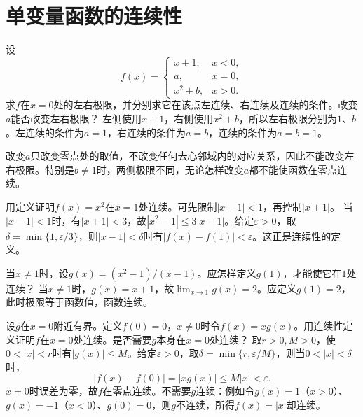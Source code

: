 \par\addvspace{12pt}

\section{单变量函数的连续性}

\label{sol:sec:functions:2}

设
\begin{equation*}
 f(x)=\begin{cases}
 x+1,&x<0,\\
 a,&x=0,\\
 x^2+b,&x>0.
 \end{cases}
\end{equation*}
求\(f\)在\(x=0\)处的左右极限，并分别求它在该点左连续、右连续及连续的条件。改变\(a\)能否改变左右极限？
\solutionanswer
左侧使用\(x+1\)，右侧使用\(x^2+b\)，所以左右极限分别为\(1\)、\(b\)。左连续的条件为\(a=1\)，右连续的条件为\(a=b\)，连续的条件为\(a=b=1\)。

改变\(a\)只改变零点处的取值，不改变任何去心邻域内的对应关系，因此不能改变左右极限。特别是\(b\ne1\)时，两侧极限不同，无论怎样改变\(a\)都不能使函数在零点连续。


用定义证明\(f(x)=x^2\)在\(x=1\)处连续。可先限制\(|x-1|<1\)，再控制\(|x+1|\)。
\solutionanswer
当\(|x-1|<1\)时，有\(|x+1|<3\)，故\(|x^2-1|\le3|x-1|\)。给定\(\varepsilon>0\)，取\(\delta=\min\{1,\varepsilon/3\}\)，则\(|x-1|<\delta\)时有\(|f(x)-f(1)|<\varepsilon\)。这正是连续性的定义。


当\(x\ne1\)时，设\(g(x)=(x^2-1)/(x-1)\)。应怎样定义\(g(1)\)，才能使它在\(1\)处连续？
\solutionanswer
当\(x\ne1\)时，\(g(x)=x+1\)，故\(\lim_{x\to1}g(x)=2\)。应定义\(g(1)=2\)，此时极限等于函数值，函数连续。


设\(g\)在\(x=0\)附近有界。定义\(f(0)=0\)，\(x\ne0\)时令\(f(x)=xg(x)\)。用连续性定义证明\(f\)在\(x=0\)处连续。是否需要\(g\)本身在\(x=0\)处连续？
\solutionanswer
取\(r>0,M>0\)，使\(0<|x|<r\)时有\(|g(x)|\le M\)。给定\(\varepsilon>0\)，取\(\delta=\min\{r,\varepsilon/M\}\)，则当\(0<|x|<\delta\)时，
\[
|f(x)-f(0)|=|xg(x)|\le M|x|<\varepsilon.
\]
\(x=0\)时误差为零，故\(f\)在零点连续。不需要\(g\)连续：例如令\(g(x)=1\)（\(x>0\)）、\(g(x)=-1\)（\(x<0\)）、\(g(0)=0\)，则\(g\)不连续，所得\(f(x)=|x|\)却连续。


